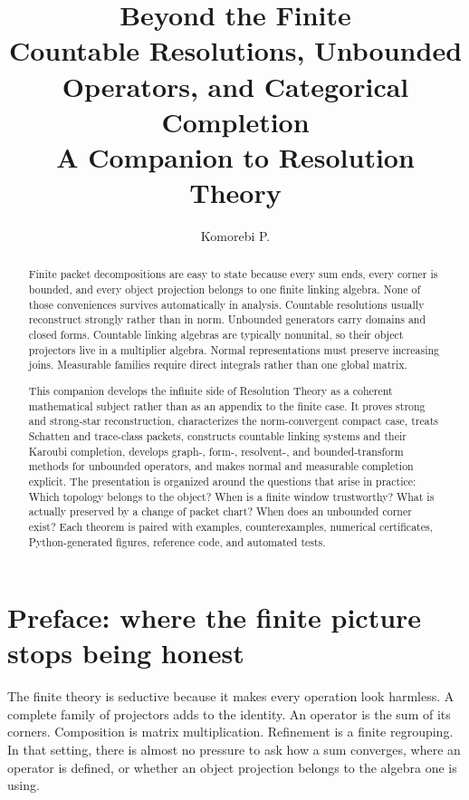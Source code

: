 \documentclass[11pt]{article}
\title{Beyond the Finite\\
\large Countable Resolutions, Unbounded Operators, and Categorical Completion\\[4pt]
\normalsize A Companion to Resolution Theory}
\author{Komorebi P.}
\date{}
\theoremstyle{definition}
\theoremstyle{remark}
\begin{document}
\maketitle
\begin{abstract}
Finite packet decompositions are easy to state because every sum ends, every corner is bounded, and every object projection belongs to one finite linking algebra.  None of those conveniences survives automatically in analysis.  Countable resolutions usually reconstruct strongly rather than in norm.  Unbounded generators carry domains and closed forms.  Countable linking algebras are typically nonunital, so their object projectors live in a multiplier algebra.  Normal representations must preserve increasing joins.  Measurable families require direct integrals rather than one global matrix.

This companion develops the infinite side of Resolution Theory as a coherent mathematical subject rather than as an appendix to the finite case.  It proves strong and strong-star reconstruction, characterizes the norm-convergent compact case, treats Schatten and trace-class packets, constructs countable linking systems and their Karoubi completion, develops graph-, form-, resolvent-, and bounded-transform methods for unbounded operators, and makes normal and measurable completion explicit.  The presentation is organized around the questions that arise in practice: Which topology belongs to the object?  When is a finite window trustworthy?  What is actually preserved by a change of packet chart?  When does an unbounded corner exist?  Each theorem is paired with examples, counterexamples, numerical certificates, Python-generated figures, reference code, and automated tests.
\end{abstract}
\tableofcontents
\clearpage


\section*{Preface: where the finite picture stops being honest}
The finite theory is seductive because it makes every operation look harmless.  A complete family of projectors adds to the identity.  An operator is the sum of its corners.  Composition is matrix multiplication.  Refinement is a finite regrouping.  In that setting, there is almost no pressure to ask how a sum converges, where an operator is defined, or whether an object projection belongs to the algebra one is using.
\end{document}
